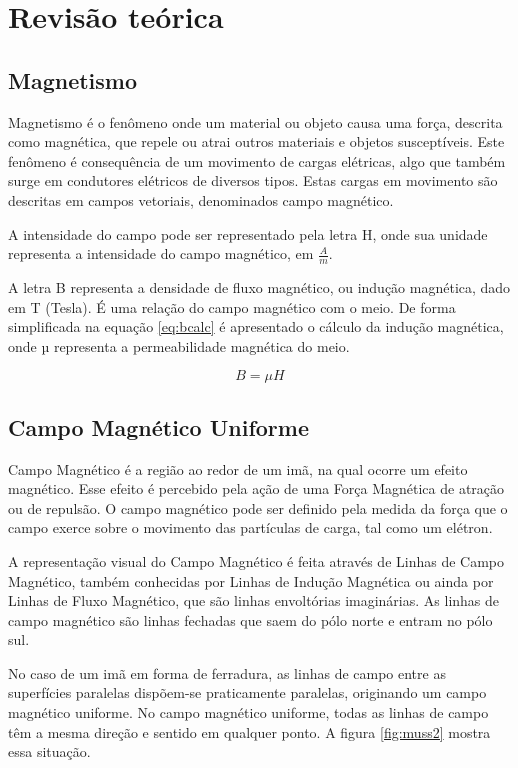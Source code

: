 \chapter{Revisão teórica}



\section{Magnetismo}

Magnetismo é o fenômeno onde um material ou objeto causa uma força,
descrita como magnética, que repele ou atrai outros materiais e objetos susceptíveis. Este fenômeno é consequência de um movimento de cargas elétricas, algo que também surge em condutores elétricos de diversos tipos. Estas cargas em movimento são descritas em campos vetoriais, denominados campo magnético.\cite{callister2010}

A intensidade do campo pode ser representado pela letra H, onde sua unidade representa a intensidade do campo magnético, em $\frac{A}{m}$.\cite{callister2010}

A letra B representa a densidade de fluxo magnético, ou indução magnética, dado em T (Tesla). É uma relação do campo magnético com o meio. De forma simplificada na equação \ref{eq:bcalc} é apresentado o cálculo da indução magnética, onde µ representa a permeabilidade magnética do meio.\cite{callister2010}

\begin{equation}
    B =\mu H
    \label{eq:bcalc}
\end{equation}

\section{Campo Magnético Uniforme}
Campo Magnético é a região ao redor de um imã, na qual ocorre um efeito magnético. Esse efeito é percebido pela ação de uma Força Magnética de atração ou de repulsão. O campo magnético pode ser definido pela medida da força que o campo exerce sobre o movimento das partículas de carga, tal como um elétron.\cite{mussoi}

A representação visual do Campo Magnético é feita através de Linhas de Campo Magnético,
também conhecidas por Linhas de Indução Magnética ou ainda por Linhas de Fluxo Magnético, que são linhas envoltórias imaginárias. As linhas de campo magnético são linhas fechadas que saem do pólo norte e
entram no pólo sul. \cite{mussoi}

No caso de um imã em forma de ferradura, as linhas de campo entre as superfícies paralelas
dispõem-se praticamente paralelas, originando um campo magnético uniforme. No campo magnético
uniforme, todas as linhas de campo têm a mesma direção e sentido em qualquer ponto. A figura \ref{fig:muss2} mostra essa situação. \cite{mussoi}

